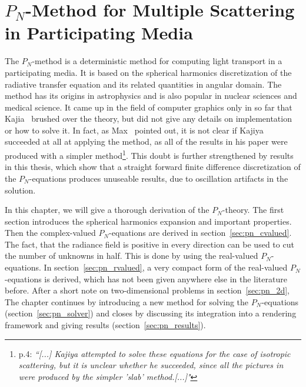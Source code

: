 \chapter{$P_N$-Method for Multiple Scattering in Participating Media}
%
\label{sec:pnmethod}

The $P_N$-method is a deterministic method for computing light transport in a participating media. It is based on the spherical harmonics discretization of the radiative transfer equation and its related quantities in angular domain. The method has its origins in astrophysics and is also popular in nuclear sciences and medical science. It came up in the field of computer graphics only in so far that Kajia~\cite{Kajiya84} brushed over the theory, but did not give any details on implementation or how to solve it. In fact, as Max~\cite{Max95} pointed out, it is not clear if Kajiya succeeded at all at applying the method, as all of the results in his paper were produced with a simpler method\footnote{\cite{Max95} p.4: \emph{``[...] Kajiya attempted to solve these equations for the case of isotropic scattering, but it is unclear whether he succeeded, since all the pictures in \cite{Kajiya84} were produced by the simpler 'slab' method.[...]"}}. This doubt is further strengthened by results in this thesis, which show that a straight forward finite difference discretization of the $P_N$-equations produces unuseable results, due to oscillation artifacts in the solution. 

In this chapter, we will give a thorough derivation of the $P_N$-theory. The first section introduces the spherical harmonics expansion and important properties. Then the complex-valued $P_N$-equations are derived in section~\ref{sec:pn_cvalued}. The fact, that the radiance field is positive in every direction can be used to cut the number of unknowns in half. This is done by using the real-valued $P_N$-equations. In section~\ref{sec:pn_rvalued}, a very compact form of the real-valued $P_N$-equations is derived, which has not been given anywhere else in the literature before. After a short note on two-dimensional problems in section~\ref{sec:pn_2d}, The chapter continues by introducing a new method for solving the $P_N$-equations (section~\ref{sec:pn_solver}) and closes by discussing its integration into a rendering framework and giving results (section~\ref{sec:pn_results}).










